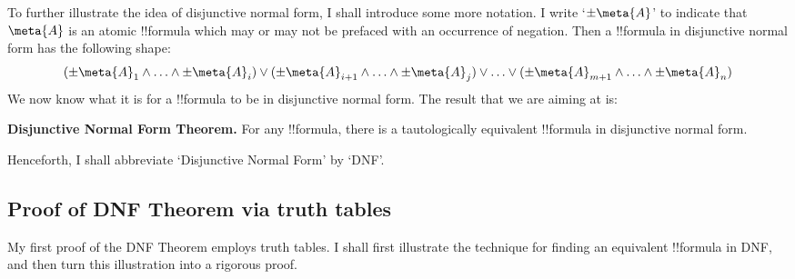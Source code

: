 \documentclass[../../../include/open-logic-section]{subfiles}
\begin{document}
To further illustrate the idea of disjunctive normal form, I shall introduce some more notation. I write `$\pm\meta{A}$' to indicate that $\meta{A}$ is an atomic !!{formula} which may or may not be prefaced with an occurrence of negation. Then a !!{formula} in disjunctive normal form has the following shape:
	$$(\pm \meta{A}_1 \land \ldots \land \pm \meta{A}_i) \lor (\pm \meta{A}_{i+1} \land \ldots \land \pm\meta{A}_j) \lor \ldots \lor (\pm\meta{A}_{m+1} \land \ldots \land \pm \meta{A}_n)$$
We now know what it is for a !!{formula} to be in disjunctive normal form. The result that we are aiming at is:
	\begin{thm}\label{thm:dnf}\textbf{Disjunctive Normal Form Theorem.} For any !!{formula}, there is a tautologically equivalent !!{formula} in disjunctive normal form.
	\end{thm}\noindent 
Henceforth, I shall abbreviate `Disjunctive Normal Form' by `DNF'. 


\subsection{Proof of DNF Theorem via truth tables}\label{s:DNFTruthTable}
My first proof of the DNF Theorem employs truth tables. I shall first illustrate the technique for finding an equivalent !!{formula} in DNF, and then turn this illustration into a rigorous proof. 
\end{document}
